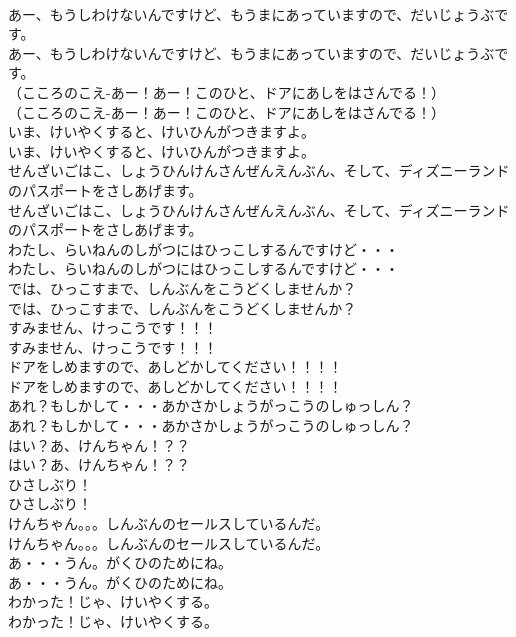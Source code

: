 \documentclass[8pt]{extreport}
\begin{document}
\begin{CJK}{UTF8}{min}
\\	あー、もうしわけないんですけど、もうまにあっていますので、だいじょうぶです。	
\\	あー、もうしわけないんですけど、もうまにあっていますので、だいじょうぶです。 
\\	（こころのこえ-あー！あー！このひと、ドアにあしをはさんでる！）	
\\	（こころのこえ-あー！あー！このひと、ドアにあしをはさんでる！） 
\\	いま、けいやくすると、けいひんがつきますよ。	
\\	いま、けいやくすると、けいひんがつきますよ。 
\\	せんざいごはこ、しょうひんけんさんぜんえんぶん、そして、ディズニーランドのパスポートをさしあげます。	
\\	せんざいごはこ、しょうひんけんさんぜんえんぶん、そして、ディズニーランドのパスポートをさしあげます。 
\\	わたし、らいねんのしがつにはひっこしするんですけど・・・	
\\	わたし、らいねんのしがつにはひっこしするんですけど・・・ 
\\	では、ひっこすまで、しんぶんをこうどくしませんか？	
\\	では、ひっこすまで、しんぶんをこうどくしませんか？ 
\\	すみません、けっこうです！！！	
\\	すみません、けっこうです！！！ 
\\	ドアをしめますので、あしどかしてください！！！！	
\\	ドアをしめますので、あしどかしてください！！！！ 
\\	あれ？もしかして・・・あかさかしょうがっこうのしゅっしん？	
\\	あれ？もしかして・・・あかさかしょうがっこうのしゅっしん？ 
\\	はい？あ、けんちゃん！？？	
\\	はい？あ、けんちゃん！？？ 
\\	ひさしぶり！	
\\	ひさしぶり！ 
\\	けんちゃん。。。しんぶんのセールスしているんだ。	
\\	けんちゃん。。。しんぶんのセールスしているんだ。 
\\	あ・・・うん。がくひのためにね。	
\\	あ・・・うん。がくひのためにね。 
\\	わかった！じゃ、けいやくする。	
\\	わかった！じゃ、けいやくする。 

\end{CJK}
\end{document}
